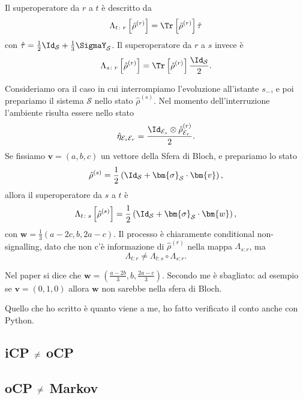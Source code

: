\documentclass[a4]{article}
\begin{document}
Il superoperatore da \(r\) a \(t\) è descritto da 
\[\Lambda_{t\colon r} \left[\hat{\rho}^{(r)}\right] =
    \Tr\left[\hat{\rho}^{(r)}\right] \hat{\tau} \]
con \(\hat{\tau} = \frac{1}{2}\Id_\mathcal{S} + \frac{1}{3}\SigmaY_\mathcal{S}\).
Il superoperatore da \(r\) a \(s\) invece è 
\[\Lambda_{s\colon r} \left[\hat{\rho}^{(r)}\right] =
    \Tr\left[\hat{\rho}^{(r)}\right] \frac{\Id_\mathcal{S}}{2}. \]
    
Consideriamo ora il caso in cui interrompiamo l'evoluzione all'istante \(s_-\), e poi
prepariamo il sistema \(\mathcal{S}\) nello stato \(\hat{\rho}^{(s)}\). Nel momento
dell'interruzione l'ambiente risulta essere nello stato
\[\hat{\eta}_{\mathcal{E}_s\mathcal{E}_r} =
      \frac{\Id_{\mathcal{E}_s}\otimes\hat{\rho}^{(r)}_{\mathcal{E}_r}}{2}.\]
Se fissiamo \(\bm{v} = (a,b,c)\) un vettore della Sfera di Bloch, e prepariamo lo
stato 
\[\hat{\rho}^{(s)} =
     \frac{1}{2} \left( \Id_\mathcal{S} + \bm{\sigma}_\mathcal{S} \cdot \bm{v} \right),\]
allora il superoperatore da \(s\) a \(t\) è 
\[\Lambda_{t\colon s} \left[\hat{\rho}^{(s)}\right] =
     \frac{1}{2} \left( \Id_\mathcal{S} + \bm{\sigma}_\mathcal{S} \cdot \bm{w} \right),\]
con \(\bm{w} = \frac{1}{3} (a-2c, b, 2a-c)\). Il processo è chiaramente conditional
non-signalling, dato che non c'è informazione di \(\hat{\rho}^{(r)}\) nella mappa
\(\Lambda_{s\colon r}\), ma 
\[\Lambda_{t\colon r} \not= \Lambda_{t\colon s} \circ \Lambda_{s\colon r}.\]
\begin{tcolorbox}[colback=red!5!white,colframe=red!75!black,title=Attenzione!]
	Nel paper \cite{CPdoesnotimply} si dice che 
	\(\bm{w} = (\frac{a-2b}{3}, b, \frac{2a-c}{3})\). Secondo me è sbagliato: 
	ad esempio se \(\bm{v} = (0,1,0)\) allora \(\bm{w}\) non sarebbe nella
	sfera di Bloch.
	
	Quello che ho scritto è quanto viene a me, ho fatto verificato
	il conto anche con Python.
\end{tcolorbox}

\subsection[iCP non è equivalente a oCP]
           {iCP \(\centernot=\) oCP} \label{cont:icpocp}

\subsection[oCP non è equivalente a Markoviano]
           {oCP \(\centernot=\) Markov} \label{cont:ocpmar}
\end{document}

